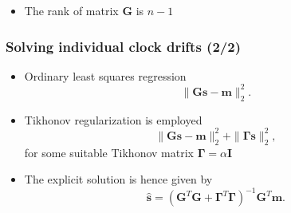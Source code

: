 \documentclass{beamer}
\begin{document}
\begin{frame}
\begin{itemize}
\item The rank of matrix $\mathbf{G}$ is $n-1$
\end{itemize}
\end{frame}

\begin{frame}
\frametitle{Solving individual clock drifts (2/2)}
\begin{itemize}
\item Ordinary least squares regression
\begin{equation}
\| \mathbf{Gs}-\mathbf{m} \|_2^2.
\label{eq:leastsquares}
\end{equation}

\item Tikhonov regularization is employed
\begin{equation}
\| \mathbf{Gs}-\mathbf{m} \|_2^2 + \| \bm{\Gamma}\mathbf{s} \|_2^2, 
\label{eq:tikhonov}
\end{equation}
\quad \quad for some suitable Tikhonov matrix $\bm{\Gamma} = \alpha\mathbf{I}$
\item The explicit solution is hence given by
\begin{equation}
\hat{\mathbf{s}} = (\mathbf{G}^T\mathbf{G} + \bm{\Gamma}^T\bm{\Gamma})^{-1}\mathbf{G}^T\mathbf{m}.  
\end{equation}

\end{itemize}

\end{frame}
\end{document}
